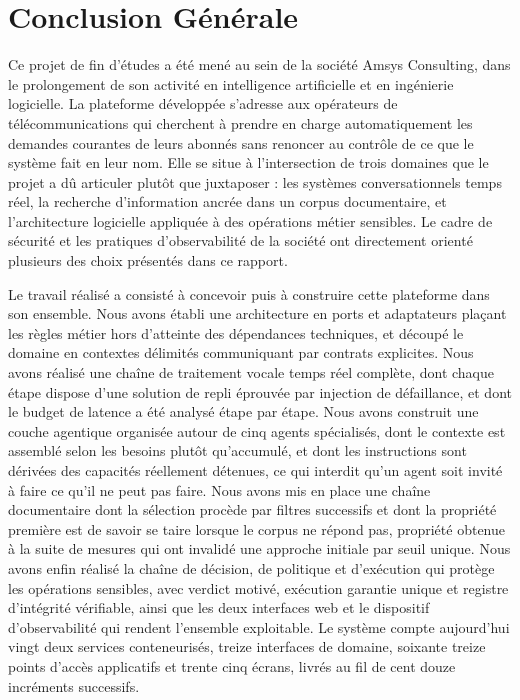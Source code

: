 \chapter*{Conclusion Générale}

Ce projet de fin d'études a été mené au sein de la société Amsys Consulting, dans le prolongement de son activité en intelligence artificielle et en ingénierie logicielle. La plateforme développée s'adresse aux opérateurs de télécommunications qui cherchent à prendre en charge automatiquement les demandes courantes de leurs abonnés sans renoncer au contrôle de ce que le système fait en leur nom. Elle se situe à l'intersection de trois domaines que le projet a dû articuler plutôt que juxtaposer : les systèmes conversationnels temps réel, la recherche d'information ancrée dans un corpus documentaire, et l'architecture logicielle appliquée à des opérations métier sensibles. Le cadre de sécurité et les pratiques d'observabilité de la société ont directement orienté plusieurs des choix présentés dans ce rapport.

Le travail réalisé a consisté à concevoir puis à construire cette plateforme dans son ensemble. Nous avons établi une architecture en ports et adaptateurs plaçant les règles métier hors d'atteinte des dépendances techniques, et découpé le domaine en contextes délimités communiquant par contrats explicites. Nous avons réalisé une chaîne de traitement vocale temps réel complète, dont chaque étape dispose d'une solution de repli éprouvée par injection de défaillance, et dont le budget de latence a été analysé étape par étape. Nous avons construit une couche agentique organisée autour de cinq agents spécialisés, dont le contexte est assemblé selon les besoins plutôt qu'accumulé, et dont les instructions sont dérivées des capacités réellement détenues, ce qui interdit qu'un agent soit invité à faire ce qu'il ne peut pas faire. Nous avons mis en place une chaîne documentaire dont la sélection procède par filtres successifs et dont la propriété première est de savoir se taire lorsque le corpus ne répond pas, propriété obtenue à la suite de mesures qui ont invalidé une approche initiale par seuil unique. Nous avons enfin réalisé la chaîne de décision, de politique et d'exécution qui protège les opérations sensibles, avec verdict motivé, exécution garantie unique et registre d'intégrité vérifiable, ainsi que les deux interfaces web et le dispositif d'observabilité qui rendent l'ensemble exploitable. Le système compte aujourd'hui vingt deux services conteneurisés, treize interfaces de domaine, soixante treize points d'accès applicatifs et trente cinq écrans, livrés au fil de cent douze incréments successifs.

